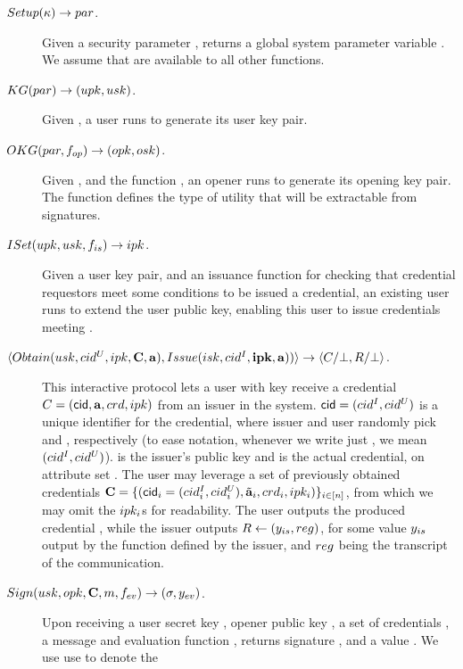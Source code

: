 \begin{description}
\item[$Setup(\kappa) \rightarrow par$.] Given a security parameter \secpar,
  returns a global system parameter variable \parm. We assume that \parm are
  available to all other functions.
\item[$KG(par) \rightarrow (upk,usk)$.] Given \parm, a user runs
  \KeyGen to generate its user key pair. 
\item[$OKG(par,f_{op}) \rightarrow (opk,osk)$.] Given \parm, and the
  function \finsp, an opener runs \OKeyGen to generate its opening key pair.
  The function \finsp defines the type of utility that will be extractable from
  signatures.
\item[$ISet(upk,usk,f_{is}) \rightarrow ipk$.] Given a user key
  pair, and an issuance function \fissue for checking that credential requestors
  meet some conditions to be issued a credential, an existing user runs \ISet to
  extend the user public key, enabling this user to issue credentials meeting
  \fissue.
\item[$\langle
  Obtain(usk,cid^U,ipk,\mathbf{C},\mathbf{a}),
  Issue(isk,cid^I,\mathbf{ipk},\mathbf{a}))  
  \rangle \rightarrow \langle C/\bot,R/\bot
  \rangle$.] %
  This interactive protocol lets a user with key \usk receive a credential
  $C=(\mathsf{cid},\mathbf{a},crd,ipk)$
  from an issuer in the system. $\mathsf{cid}=(cid^I,cid^U)$ is a unique identifier for
  the credential, where issuer and user randomly pick \cidi and \cidu,
  respectively (to ease notation, whenever we write just \cid, we mean $(cid^I,
  cid^U)$). \ipk is the issuer's public key and \cred is the actual credential,
  on attribute set \attrs. The user may leverage a set of previously obtained
  credentials $\mathbf{C}=\lbrace (\mathsf{cid}_i=(cid^I_i,cid^U_i),\tilde{\mathbf{a}}_i,crd_i,
  ipk_i)\rbrace_{i\in[n]}$, from which we may omit the $ipk_i$s for
  readability. The user outputs the produced credential \Cred, while the issuer
  outputs $R \gets (y_{is},reg)$, for some value $y_{is}$ output by
  the \fissue function defined by the issuer, and $reg$ being the transcript
  of the communication.
\item[$Sign(usk,opk,\mathbf{C},m,f_{ev}) \rightarrow (\sigma,y_{ev})$.] %
  Upon receiving a user secret key \usk, opener public key \opk, a set of
  credentials \sCred, a message \msg and evaluation function \feval, returns
  signature \sig, and a value \yeval. We use use \Sig to denote the

\end{description}
